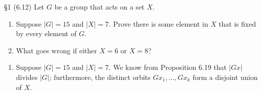 \documentclass{homework}
\begin{document}
\begin{problem}{\S 1}
  (6.12) Let $G$ be a group that acts on a set $X$.
  \begin{enumerate}[label=(\alph*)]
    \item Suppose $\left|G\right|=15$ and $\left|X\right|=7$. Prove there is some element in $X$ that is fixed by every
      element of $G$.
    \item What goes wrong if either $X=6$ or $X=8$?
  \end{enumerate}
\end{problem}

\begin{solution}
  \begin{enumerate}[label=(\alph*)]
    \item Suppose $\left|G\right|=15$ and $\left|X\right|=7$. We know from Proposition 6.19 that
      $\left|Gx\right|$ divides $\left|G\right|$; furthermore, the distinct orbits
      $Gx_1,\ldots,Gx_k$ form a disjoint union of $X$.


\end{enumerate}
\end{solution}
\end{document}

